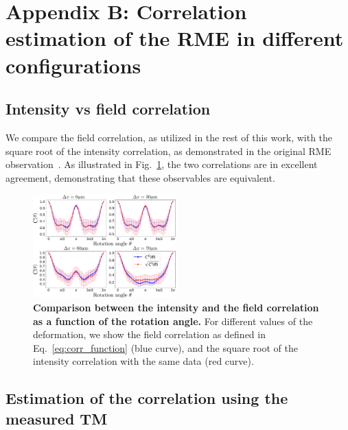 \documentclass[aps,prl,twocolumn, amsmath,amssymb,superscriptaddress]{revtex4-2}
\begin{document}

\section*{Appendix B: Correlation estimation of the RME in different configurations}

\subsection*{Intensity vs field correlation}

We compare the field correlation, as utilized in the rest of this work, 
with the square root of the intensity correlation, 
as demonstrated in the original RME observation~\cite{amitonova2015rotational}. 
As illustrated in Fig.~\ref{fig:CEvsCI}, the two correlations are in excellent agreement, 
demonstrating that these observables are equivalent.




\begin{figure}[ht]
\includegraphics[width=0.49\textwidth]{images/Fig_A1.pdf}
\caption{
    \textbf{Comparison between the intensity and the field correlation as a function of the rotation angle.}
    For different values of the deformation, 
    we show the field correlation as defined in Eq.~\ref{eq:corr_function} (blue curve), 
    and the square root of the intensity correlation with the same data (red curve).
}
\label{fig:CEvsCI}
\end{figure}

\subsection*{Estimation of the correlation using the measured TM}
\end{document}
